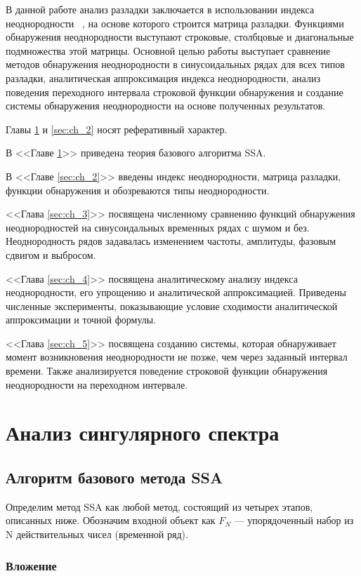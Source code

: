 \documentclass[specialist, substylefile = spbu.rtx,
			   subf, href, 12pt]{disser}
\begin{document}
В данной работе анализ разладки заключается в использовании индекса неоднородности ~\cite{Golyandina2001}, на основе которого строится матрица разладки. Функциями обнаружения неоднородности выступают строковые, столбцовые и диагональные подмножества этой матрицы. Основной целью работы выступает сравнение методов обнаружения неоднородности в синусоидальных рядах для всех типов разладки, аналитическая аппроксимация индекса неоднородности, анализ поведения переходного интервала строковой функции обнаружения и создание системы обнаружения неоднородности на основе полученных результатов.

Главы \ref{sec:ch_1} и \ref{sec:ch_2} носят реферативный характер.

В <<Главе \ref{sec:ch_1}>> приведена теория базового алгоритма SSA.

В <<Главе \ref{sec:ch_2}>> введены индекс неоднородности, матрица разладки, функции обнаружения и обозреваются типы неоднородности.

<<Глава \ref{sec:ch_3}>> посвящена численному сравнению функций обнаружения неоднородностей на синусоидальных временных рядах с шумом и без. Неоднородность рядов задавалась изменением частоты, амплитуды, фазовым сдвигом и выбросом.

<<Глава \ref{sec:ch_4}>> посвящена аналитическому анализу индекса неоднородности, его упрощению и аналитической аппроксимацией. Приведены численные эксперименты, показывающие условие сходимости аналитической аппроксимации и точной формулы.

<<Глава \ref{sec:ch_5}>> посвящена созданию системы, которая обнаруживает момент возникновения неоднородности не позже, чем через заданный интервал времени. Также анализируется поведение строковой функции обнаружения неоднородности на переходном интервале.



\newpage
\chapter{Анализ сингулярного спектра} \label{sec:ch_1}
\section{Алгоритм базового метода SSA}
Определим метод SSA как любой метод, состоящий из четырех этапов, описанных ниже. Обозначим входной объект как $F_N$ --- упорядоченный набор из $\mathrm{N}$ действительных чисел (временной ряд).

\subsection{Вложение}
\label{step:Embedding}
\end{document}
